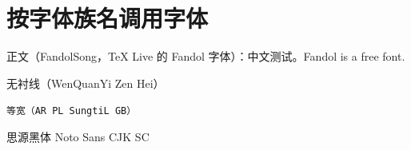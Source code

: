 \documentclass[UTF8]{ctexart}
\begin{document}
\section{按字体族名调用字体}

正文（FandolSong，TeX Live 的 Fandol 字体）：中文测试。Fandol is a free font.

\textsf{无衬线（WenQuanYi Zen Hei）}

\texttt{等宽（AR PL SungtiL GB）}

{\notosans 思源黑体 Noto Sans CJK SC}
\end{document}
